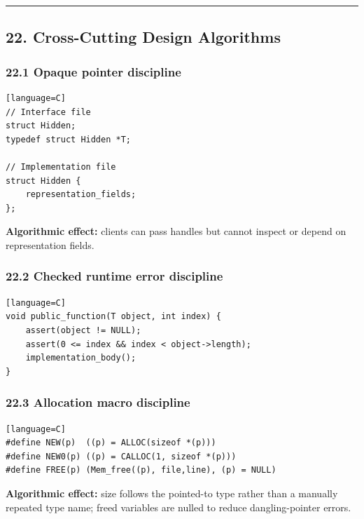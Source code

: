 \documentclass[11pt]{article}
\begin{document}
\begin{center}\rule{0.5\linewidth}{0.5pt}\end{center}

\subsection{22. Cross-Cutting Design Algorithms}\label{cross-cutting-design-algorithms}

\subsubsection{22.1 Opaque pointer discipline}\label{opaque-pointer-discipline}

\begin{verbatim}[language=C]
// Interface file
struct Hidden;
typedef struct Hidden *T;

// Implementation file
struct Hidden {
    representation_fields;
};
\end{verbatim}

\textbf{Algorithmic effect:} clients can pass handles but cannot inspect or depend on representation fields.

\subsubsection{22.2 Checked runtime error discipline}\label{checked-runtime-error-discipline}

\begin{verbatim}[language=C]
void public_function(T object, int index) {
    assert(object != NULL);
    assert(0 <= index && index < object->length);
    implementation_body();
}
\end{verbatim}

\subsubsection{22.3 Allocation macro discipline}\label{allocation-macro-discipline}

\begin{verbatim}[language=C]
#define NEW(p)  ((p) = ALLOC(sizeof *(p)))
#define NEW0(p) ((p) = CALLOC(1, sizeof *(p)))
#define FREE(p) (Mem_free((p), file,line), (p) = NULL)
\end{verbatim}

\textbf{Algorithmic effect:} size follows the pointed-to type rather than a manually repeated type name; freed variables are nulled to reduce dangling-pointer errors.
\end{document}
